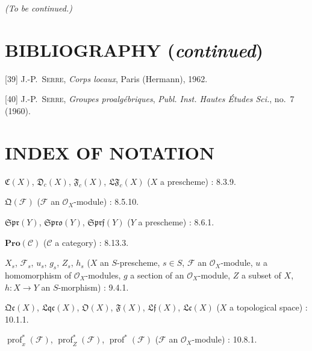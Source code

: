 
\begin{center}
\emph{(To be continued.)}
\end{center}

\clearpage
{}
{}
\section*{BIBLIOGRAPHY (\emph{continued})}

\begingroup
\small
\setlength{\parindent}{0pt}
\setlength{\parskip}{3pt}
[39] J.-P.~\textsc{Serre}, \emph{Corps locaux}, Paris (Hermann), 1962.

[40] J.-P.~\textsc{Serre}, \emph{Groupes proalgébriques}, \emph{Publ. Inst. Hautes Études Sci.}, no.~7 (1960).

\endgroup

\clearpage
{}
{}
\section*{INDEX OF NOTATION}

\begingroup
\small
\setlength{\parindent}{0pt}
\setlength{\parskip}{2pt}

$\mathfrak C(X)$, $\mathfrak D_c(X)$, $\mathfrak F_c(X)$,
$\mathfrak{LF}_c(X)$ ($X$ a prescheme) : 8.3.9.

$\mathfrak Q(\mathcal F)$ ($\mathcal F$ an $\mathcal O_X$-module) : 8.5.10.

$\mathfrak{Spr}(Y)$, $\mathfrak{Spro}(Y)$, $\mathfrak{Sprf}(Y)$
($Y$ a prescheme) : 8.6.1.

$\mathbf{Pro}(\mathcal C)$ ($\mathcal C$ a category) : 8.13.3.

$X_s$, $\mathcal F_s$, $u_s$, $g_s$, $Z_s$, $h_s$
($X$ an $S$-prescheme, $s\in S$, $\mathcal F$ an $\mathcal O_X$-module,
$u$ a homomorphism of $\mathcal O_X$-modules, $g$ a section of an
$\mathcal O_X$-module, $Z$ a subset of $X$, $h:X\to Y$ an $S$-morphism) : 9.4.1.

$\mathfrak{Qc}(X)$, $\mathfrak{Lqc}(X)$, $\mathfrak O(X)$,
$\mathfrak F(X)$, $\mathfrak{Lf}(X)$, $\mathfrak{Lc}(X)$
($X$ a topological space) : 10.1.1.

$\operatorname{prof}^{*}_{x}(\mathcal F)$,
$\operatorname{prof}^{*}_{Z}(\mathcal F)$,
$\operatorname{prof}^{*}(\mathcal F)$
($\mathcal F$ an $\mathcal O_X$-module) : 10.8.1.


